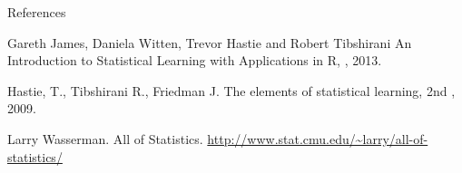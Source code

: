 \documentclass[10pt,a4paper]{beamer}
\begin{document}
\begin{frame}{References}
\begin{thebibliography}{10}\scriptsize


%
%

\beamertemplatebookbibitems
\bibitem{}
Gareth James, Daniela Witten, Trevor Hastie and Robert Tibshirani
\newblock An Introduction to Statistical Learning with Applications in R,
, 2013.

\bibitem{}
Hastie, T., Tibshirani R., Friedman J.
\newblock The elements of statistical learning, 2nd
, 2009.

\bibitem{}
Larry Wasserman.
\newblock All of Statistics. 
\newblock \url{http://www.stat.cmu.edu/~larry/all-of-statistics/}

%


\end{thebibliography}

\end{frame}
\end{document}
